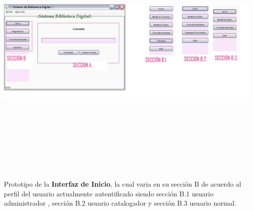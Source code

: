 \begin{minipage}{1\textwidth}
	\begin{center}
	\includegraphics[width= 20cm , height= 13cm,angle=90]{prototiposGui/guiPpal}
	\end{center}
	{Prototipo de la {\bf Interfaz de Inicio}, la cual varia en su sección B de acuerdo al perfil
	del usuario actualmente autentificado siendo sección B.1 usuario administrador  , sección B.2
	usuario catalogador y sección B.3 usuario normal.}
\end{minipage}\\[1cm]


